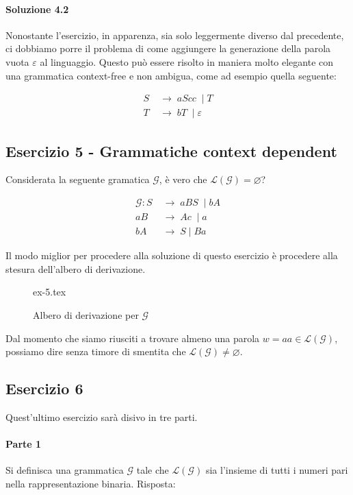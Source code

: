 \documentclass[class=book, crop=false, oneside, 12pt]{standalone}
\begin{document}
\paragraph{Soluzione 4.2}
Nonostante l'esercizio, in apparenza, sia solo leggermente diverso dal precedente, ci dobbiamo porre il problema di come aggiungere la generazione della parola vuota \(\varepsilon\) al linguaggio. Questo può essere risolto in maniera molto elegante con una grammatica context-free e non ambigua, come ad esempio quella seguente:

\begin{align*}
  S\; &\to\; aScc\; \mid T \\
  T\; &\to\; bT\; \mid \varepsilon
\end{align*}

\subsection*{Esercizio 5 - Grammatiche context dependent}
Considerata la seguente gramatica \(\mathcal{G}\), è vero che \(\mathcal{L(G)} = \varnothing\)?

\begin{align*}
  \mathcal{G}: S\; &\to\; aBS\; \mid bA \\
  aB\; &\to\; Ac\; \mid a \\
  bA\; &\to\; S \mid Ba
\end{align*}

\noindent Il modo miglior per procedere alla soluzione di questo esercizio è procedere alla stesura dell'albero di derivazione.

\begin{figure}[H]
	\centering
	{ex-5.tex}
	\caption{Albero di derivazione per \(\mathcal{G}\)}
\end{figure}

\noindent Dal momento che siamo riusciti a trovare almeno una parola \(w = aa \in \mathcal{L(G)}\), possiamo dire senza timore di smentita che \(\mathcal{L(G)} \neq \varnothing\).

\subsection*{Esercizio 6}
Quest'ultimo esercizio sarà disivo in tre parti.

\paragraph{Parte 1}
Si definisca una grammatica \(\mathcal{G}\) tale che \(\mathcal{L(G)}\) sia l'insieme di tutti i numeri pari nella rappresentazione binaria. Risposta:
\end{document}
